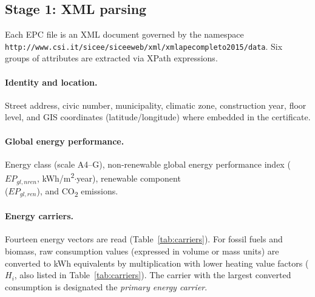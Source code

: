 \documentclass[runningheads,orivec]{llncs}
\begin{document}
\subsection{Stage 1: XML parsing}
\label{sec:parsing}

Each EPC file is an XML document governed by the namespace \\
\texttt{http://www.csi.it/sicee/siceeweb/xml/xmlapecompleto2015/data}. Six \\groups of attributes are extracted via XPath expressions.

\paragraph{Identity and location.}
Street address, civic number, municipality, climatic zone, construction
year, floor level, and GIS coordinates (latitude/longitude) where
embedded in the certificate.

\paragraph{Global energy performance.}
Energy class (scale A4--G), non-renewable global energy performance
index ($EP_{gl,nren}$, kWh/m\textsuperscript{2}$\cdot$year),
renewable component \\ ($EP_{gl,ren}$), and CO\textsubscript{2} emissions.

\paragraph{Energy carriers.}
Fourteen energy vectors are read (Table~\ref{tab:carriers}). For
fossil fuels and biomass, raw consumption values (expressed in
volume or mass units) are converted to kWh equivalents by
multiplication with lower heating value factors ($H_i$, also listed
in Table~\ref{tab:carriers}). The carrier with the largest converted
consumption is designated the \emph{primary energy carrier}.
\end{document}
